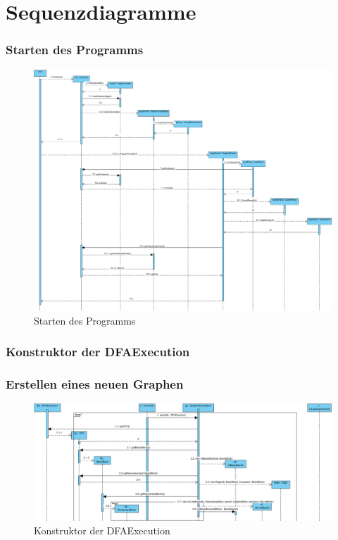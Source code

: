 
\part{Sequenzdiagramme}

\section{Starten des Programms}
\FloatBarrier
\begin{figure}
  \centering
    \includegraphics[width=1\textwidth]{Sequenzdiagramme/ProgramStart}
  \caption{Starten des Programms}
  \label{fig:start}
\end{figure}
\FloatBarrier
\clearpage


\section{Konstruktor der DFAExecution}
\clearpage


\section{Erstellen eines neuen Graphen}
\begin{figure}[!htp]
  \centering
    \includegraphics[width=1\textwidth]{Sequenzdiagramme/CreateNewGraph}
  \caption{Konstruktor der DFAExecution}
  \label{fig:constructor}
\end{figure}
\newpage
\clearpage

